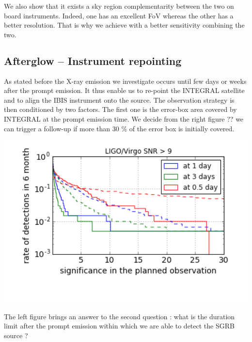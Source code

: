 \documentclass[a0,portrait]{a0poster}
\begin{document}
\begin{multicols}{2}
We also show that it exists a sky region complementarity between the two on board
instruments. Indeed, one has an excellent FoV whereas the other has a better
resolution. That is why we achieve with a better sensitivity combining the two.

\subsection*{Afterglow -- Instrument repointing}

As stated before the X-ray emission we investigate occurs until few days or
weeks after the prompt emission. It thus enable us to re-point the INTEGRAL
satellite and to align the IBIS instrument onto the source. The observation
strategy is then conditioned by two factors. The first one is the error-box area
covered by INTEGRAL at the prompt emission time. We decide from the right figure
?? we can trigger a follow-up if more than 30 \% of the error box is initially
covered.

\begin{center}\vspace{.5cm}
    \includegraphics[width=20cm]{figures/significance_vs_rate_af.png}
    \label{covered_region}
\end{center}

The left figure brings an answer to the second question : what is the duration
limit after the prompt emission within which we are able to detect the SGRB
source ?



\end{multicols}
\end{document}
